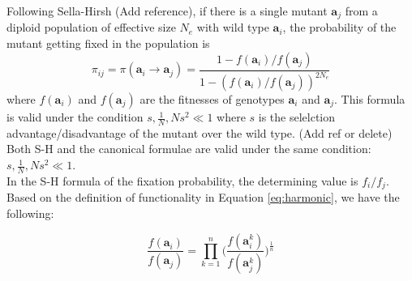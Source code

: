 \documentclass[13pt]{article}
\begin{document}
Following Sella-Hirsh (Add reference), if there is a single mutant $\mathbf{a}_j$ from a diploid population of effective size $N_e$ with wild type $\mathbf{a}_i$, the probability of the mutant getting fixed in the population is 
\begin{equation}
\pi_{ij} = \pi(\mathbf{a}_i \to \mathbf{a}_j ) = \frac{1-f(\mathbf{a}_i)/f(\mathbf{a}_j)}{1-(f(\mathbf{a}_i)/f(\mathbf{a}_j))^{2N_e}}
\label{eq:fixation}
\end{equation}
where $f(\mathbf{a}_i)$ and $f(\mathbf{a}_j)$ are the fitnesses of genotypes $\mathbf{a}_i$ and $\mathbf{a}_j$.
This formula is valid under the condition $s, \frac{1}{N}, Ns^2 \ll 1$ where $s$ is the selelction advantage/disadvantage of the mutant over the wild type. (Add ref or delete)\\

%
%
Both S-H and the canonical formulae are valid under the same condition: $s, \frac{1}{N}, Ns^2 \ll 1$.\\




In the S-H formula of the fixation probability, the determining value is $f_i/f_j$.
Based on the definition of functionality in Equation \ref{eq:harmonic}, we have the following:

\begin{equation}
\frac{f(\mathbf{a}_i)}{f(\mathbf{a}_j)} = \prod_{k=1}^n\Big( \frac{f(\mathbf{a}_i^k)}{f(\mathbf{a}_j^k)}\Big)^{\frac{1}{n}}
\end{equation}
\end{document}
